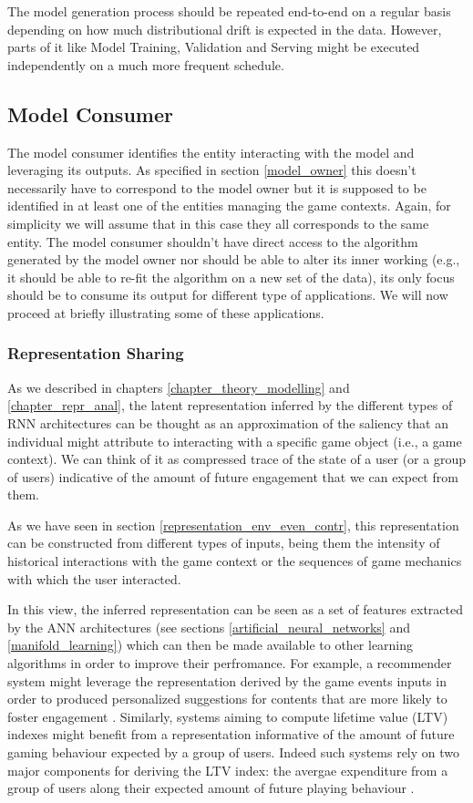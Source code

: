 The model generation process should be repeated end-to-end on a regular basis depending on how much distributional drift is expected in the data. However, parts of it like Model Training, Validation and Serving might be executed independently on a much more frequent schedule. 

\subsection{Model Consumer}
The model consumer identifies the entity interacting with the model and leveraging its outputs. As specified in section \ref{model_owner} this doesn't necessarily have to correspond to the model owner but it is supposed to be identified in at least one of the entities managing the game contexts. Again, for simplicity we will assume that in this case they all corresponds to the same entity. The model consumer shouldn't have direct access to the algorithm generated by the model owner nor should be able to alter its inner working (e.g., it should be able to re-fit the algorithm on a new set of the data), its only focus should be to consume its output for different type of applications. We will now proceed at briefly illustrating some of these applications.

\subsubsection{Representation Sharing}
As we described in chapters \ref{chapter_theory_modelling} and \ref{chapter_repr_anal}, the latent representation inferred by the different types of RNN architectures can be thought as an approximation of the saliency that an individual might attribute to interacting with a specific game object (i.e., a game context). We can think of it as compressed trace of the state of a user (or a group of users) indicative of the amount of future engagement that we can expect from them. 

As we have seen in section \ref{representation_env_even_contr}, this representation can be constructed from different types of inputs, being them the intensity of historical interactions with the game context or the sequences of game mechanics with which the user interacted. 

In this view, the inferred representation can be seen as a set of features extracted by the ANN architectures (see sections \ref{artificial_neural_networks} and \ref{manifold_learning}) which can then be made available to other learning algorithms in order to improve their perfromance. For example, a recommender system might leverage the representation derived by the game events inputs in order to produced personalized suggestions for contents that are more likely to foster engagement \cite{bertens2018machine}. Similarly, systems aiming to compute lifetime value (LTV) indexes might benefit from a representation informative of the  amount of future gaming behaviour expected by a group of users. Indeed such systems rely on two major components for deriving the LTV index: the avergae expenditure from a group of users along their expected amount of future playing behaviour  \cite{chen2018customer}.

